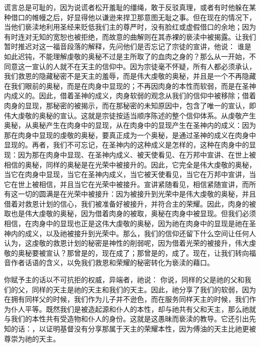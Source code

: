 谎言总是可耻的，因为说谎者松开羞耻的缰绳，敢于反驳真理，或者有时他躲在某种借口的帷幔之后，好显得他以谦逊来捍卫那意图无耻之事。但在现在的情况下，当他们亵渎地利用圣经来贬低我们主的尊严时，没有脸红或虚假借口的余地；因为有时连对无知的宽恕也被拒绝，而故意的曲解则在其赤裸的亵渎中被揭露。让我们暂时推迟对这一福音段落的解释，先问他们是否忘记了宗徒的宣讲，他说：  谁是如此迟钝，不能理解虔敬的奥秘不过是主所取了的血肉之身的？那么从一开始，不同意这一宣认的人就不在天主的信仰中。因为宗徒毫不怀疑，所有人都必须承认，我们救恩的隐藏秘密不是天主的羞辱，而是伟大虔敬的奥秘，并且是一个不再隐藏在我们眼前的奥秘，而是在肉身中显现的；不再因肉身的本性而软弱，而是在圣神内成义的。因此，借着圣神的成义，肉身软弱的观念从我们的信仰中被移除；借着肉身的显现，那秘密的被揭示，而在那秘密的未知原因中，包含了唯一的宣认，即伟大虔敬的奥秘的宣认。这就是宗徒按适当顺序陈述的整个信仰体系。从虔敬产生奥秘，从奥秘产生在肉身中的显现，从在肉身中的显现产生在圣神内的成义：因为那在肉身中显现的虔敬的奥秘，要真正成为一个奥秘，是通过圣神的成义在肉身中显现的。再者，我们不可忘记，在圣神内的这种成义是怎样的，这种在肉身中的显现：因为那在肉身中显现、在圣神内成义、被天使看见、在万邦中宣讲、在世上被相信的奥秘，同样的奥秘是在光荣中被接升的。因此，它完全是伟大虔敬的奥秘，当它在肉身中显现，当它在圣神内成义，当它被天使看见，当它在万邦中宣讲，当它在世上被相信，并且当它在光荣中被接升。宣讲紧随看见，相信紧随宣讲，而所有这一切的圆满是在光荣中被接升：因为被接升到光荣中是伟大虔敬的奥秘，并且借着对救恩计划的信心，我们被准备好被接升，并符合主的荣耀。因此，肉身的被取也是伟大虔敬的奥秘，因为借着肉身的被取，奥秘在肉身中被显现。但我们必须相信，在肉身中的显现也正是这伟大虔敬的奥秘，因为祂在肉身中的显现是祂在圣神内的成义，以及祂被接升到光荣中。那么，我们的信仰还留下什么空间让任何人认为，这虔敬的救恩计划的秘密是神性的削弱呢，因为借着光荣的被接升，伟大虔敬的奥秘要被宣认？那曾是的，现在成了；那曾是的，成了。现在，让我们转向福音作者话语的含义，以免我们救恩和荣耀的秘密转化为亵渎的藉口。\par

你赋予主的话以不可抗拒的权威，异端者，祂说：  你说，同样的父是祂的父和我们的父，同样的天主是祂的天主和我们的天主。因此，祂分享了我们的软弱，因为在拥有同样父的时候，我们作为儿子并不逊色，而在服务同样天主的时候，我们作为仆人平等。既然我们是被造起源和仆人的本性，却与祂共有父和天主，那么祂就与我们的本性共有受造物和仆人的身份。这就是这愚昧而亵渎的教导。它还引出先知的话：，以证明基督没有分享那属于天主的荣耀本性，因为傅油的天主比祂更被尊崇为祂的天主。\par

